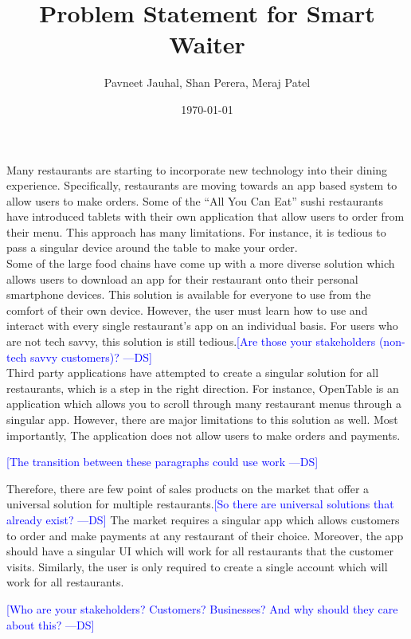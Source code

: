 \documentclass[12pt]{article}
\newcommand{\authornote}[3]{\textcolor{#1}{[#3 ---#2]}}
\newcommand{\authornote}[3]{}
\newcommand{\ds}[1]{\authornote{blue}{DS}{#1}}
\begin{document}
\title{Problem Statement for Smart Waiter} 
\author{Pavneet Jauhal, Shan Perera, Meraj Patel}
\date{\today}

\maketitle

	Many restaurants are starting to incorporate new technology into their dining experience. Specifically, restaurants are moving towards an app based system to allow users to make orders. Some of the ``All You Can Eat'' sushi restaurants have introduced tablets with their own application that allow users to order from their menu. This approach has many limitations. For instance, it is tedious to pass a singular device around the table to make your order. \\
	
	Some of the large food chains have come up with a more diverse solution which allows users to download an app for their restaurant onto their personal smartphone devices. This solution is available for everyone to use from the comfort of their own device. However, the user must learn how to use and interact with every single restaurant's app on an individual basis.  For users who are not tech savvy, this solution is still tedious.\ds{Are those your stakeholders (non-tech savvy customers)?}\\
	
	Third party applications have attempted to create a singular solution for all restaurants, which is a step in the right direction. For instance, OpenTable is an application which allows you to scroll through many restaurant menus through a singular app. However, there are major limitations to this solution as well. Most importantly, The application does not allow users to make orders and payments.

	\ds{The transition between these paragraphs could use work}

	Therefore, there are few point of sales products on the market that offer a universal solution for multiple restaurants.\ds{So there are universal solutions that already exist?}  The market requires a singular app which allows customers to order and make payments at any restaurant of their choice. Moreover, the app should have a singular UI which will work for all restaurants that the customer visits. Similarly, the user is only required to create a single account which will work for all restaurants.

\ds{Who are your stakeholders? Customers? Businesses? And why should they care about this?}
\end{document}
